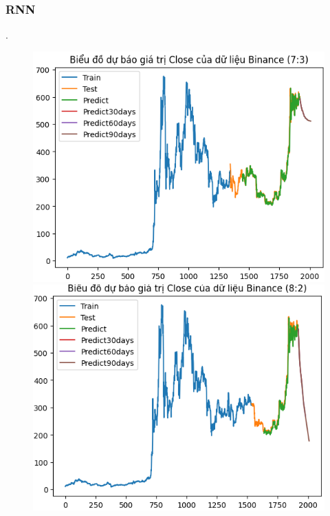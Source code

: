\documentclass[conference]{IEEEtran}
\begin{document}
\subsubsection{RNN}.
\begin{figure}[H]
    \centering
    \begin{minipage}{0.15\textwidth}
    \centering
    \includegraphics[width=1\textwidth]{Figure/RNN_BNB73.png}
    \end{minipage}
    \hfill
    \begin{minipage}{0.15\textwidth}
    \centering
    \includegraphics[width=1\textwidth]{Figure/RNN_BNB82.png}
    \end{minipage}

\end{figure}
\end{document}
